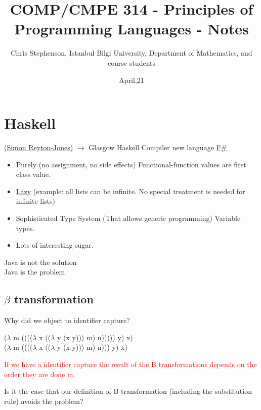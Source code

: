 \documentclass{article}
\begin{document}
\title{COMP/CMPE 314 - Principles of Programming Languages - Notes}
\author{Chris Stephenson, Istanbul Bilgi University, Department of Mathematics, and course students}
\date{April,21}
\maketitle

\section{Haskell}
\begin{flushleft}
\underline{(Simon Reyton-Jones)} $\rightarrow$ Glasgow Haskell Compiler new language \underline{F\#}
\begin{itemize}
\item Purely (no assignment, no side effects) Functional-function values are first class value.
\item \underline{Lazy} (example: all lists can be infinite. No special treatment is needed for infinite lists)
\item Sophisticated Type System (That allows generic programming) Variable types.
\item Lots of interesting sugar.
\end{itemize}
\begin{flushleft}
\begin{tcolorbox}
Java is not the solution\\
Java is the problem
\end{tcolorbox}
\bigskip
\end{flushleft}
	
\subsection*{$\beta$ transformation}
\begin{flushleft}
Why did we object to identifier capture?\\
\begin{flushleft}
\doublespacing 
($\lambda$ m (((($\lambda$ x (($\lambda$ y (x y))) m) n))))) y) x)\\ ($\lambda$ m (((($\lambda$ x (($\lambda$ y (x y))) m) n))) y) x)
\end{flushleft}
\textcolor{red}{If we have a identifier capture the result of the B transformations depends on the order they are done in.}
\end{flushleft}
\begin{flushleft}
Is it the case that our definition of B transformation (including the substitution rule) avoids the problem?\\
\bigskip
\end{flushleft}


\end{flushleft}
\end{document}
